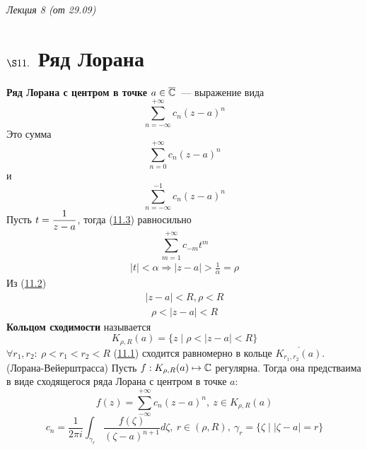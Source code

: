 \begin{flushright}
    \textit{Лекция 8 (от 29.09)}
\end{flushright}
\section{$\S 11.$ Ряд Лорана}
\Def
\textbf{Ряд Лорана с центром в точке $a \in \overline{\mathbb{C}}$}~--- выражение вида
\begin{equation}\label{(11.1)}
    \sum_{n=-\infty}^{+\infty}c_n(z-a)^n
\end{equation}
Это сумма
\begin{equation}\label{(11.2)}
    \sum_{n=0}^{+\infty}c_n(z-a)^n
\end{equation}
и
\begin{equation}\label{(11.3)}
    \sum_{n=-\infty}^{-1}c_n(z-a)^n
\end{equation}
Пусть $t = \displaystyle \frac{1}{z-a}$, тогда (\href{(11.3)}{11.3}) равносильно
\begin{equation}\label{(11.4)}
    \sum_{m=1}^{+\infty}c_{-m}t^m
\end{equation}
\begin{align*}
  \left| t \right| < \alpha \Rightarrow \left| z - a \right| > \frac{1}{\alpha} = \rho
\end{align*}
Из (\href{(11.2)}{11.2})
\begin{align*}
  \left| z-a \right|<R, \rho < R
\end{align*}
\begin{align*}
  \rho < \left| z-a \right| < R
\end{align*}
\textbf{Кольцом сходимости} называется
\begin{equation}\label{(11.5)}
    K_{\rho, R}(a) = \{z \mid \rho < \left| z-a \right| < R\}
\end{equation}
$\forall r_1, r_2: \ \rho < r_1 < r_2 < R$ (\href{(11.1)}{11.1}) сходится
равномерно в кольце $\overline{K_{r_1,r_2}(a)}$.
\theorem (Лорана-Вейерштрасса)
Пусть $f: K_{\rho,R}(a) \mapsto \mathbb{C}$ регулярна. Тогда она предстваима в виде
сходящегося ряда Лорана с центром в точке $a$:
\begin{equation}\label{(11.6)}
    f(z) = \sum_{-\infty}^{+\infty}c_n(z-a)^n, \ z \in K_{\rho,R}(a)
\end{equation}
\begin{equation}\label{(11.7)}
    c_n = \frac{1}{2\pi i}\int_{\gamma_r}\frac{f(\zeta)}{(\zeta - a)^{n+1}}d\zeta, \ r \in (\rho, R), \ \gamma_r = \{\zeta \mid \left| \zeta - a \right| = r\}
\end{equation}
